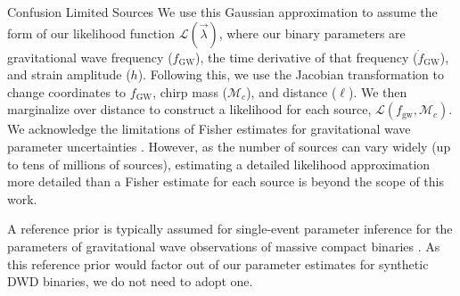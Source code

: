\documentclass[twocolumn]{aastex631}
\newcommand*{\gwL}{\mathcal{L}}
\newcommand*{\BinaryParameters}{\vec{\lambda}}
\newcommand*{\lumdist}{\mathrm{\ell}}
\newcommand*\mc{\mathcal{M}_c}
\newcommand*{\fgw}{f_{\mathrm{gw}}}
\begin{document}
\begin{subsection}{Confusion Limited Sources}
We use this Gaussian approximation to assume the form of our
    likelihood function $\gwL(\BinaryParameters)$,
    where our binary parameters are
    gravitational wave frequency ($f_\mathrm{GW}$),
    the time derivative of that frequency ($\dot{f}_{\mathrm{GW}}$),
    and strain amplitude ($h$).
Following this, we use the Jacobian transformation to change coordinates
    to $f_{\mathrm{GW}}$, chirp mass ($\mc$), and distance ($\lumdist$).
We then marginalize over distance to construct a likelihood 
    for each source, $\gwL(\fgw, \mc)$.
We acknowledge the limitations of Fisher estimates for gravitational wave
    parameter uncertainties
    \citep{Vallisneri2008}.
However,
    as the number of sources can vary widely (up to tens of millions of sources),
    estimating a detailed likelihood approximation more detailed than a Fisher estimate
    for each source
is beyond the scope of this work.

A reference prior is typically assumed for single-event parameter inference
    for the parameters of gravitational wave observations of massive compact binaries
    \citep{Veitch2015LALInference, Bilby2019, CallisterPrior2021}.
As this reference prior would factor out of our parameter estimates for 
    synthetic DWD binaries, we do not need to adopt one.

\end{subsection}
\end{document}
